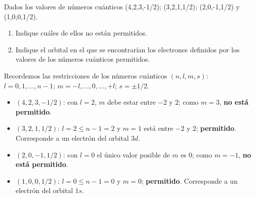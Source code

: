 \begin{exercise}
    Dados los valores de números cuánticos (4,2,3,-1/2); (3,2,1,1/2); (2,0,-1,1/2) y (1,0,0,1/2).
    \begin{enumerate}[label=\letraminuscula]
        \item Indique cuáles de ellos no están permitidos.
        \item Indique el orbital en el que se encontrarían los electrones definidos por los valores de los números cuánticos permitidos.
    \end{enumerate}
    \begin{solu}
        Recordemos las restricciones de los números cuánticos \((n,l,m,s)\): \(l = 0, 1, \ldots, n-1\); \(m = -l, \ldots, 0, \ldots, +l\); \(s = \pm 1/2\).
        \begin{itemize}
            \item \((4,2,3,-1/2)\): con \(l=2\), \(m\) debe estar entre \(-2\) y \(2\); como \(m=3\), \textbf{no está permitido}.
            \item \((3,2,1,1/2)\): \(l=2 \leq n-1=2\) y \(m=1\) está entre \(-2\) y \(2\); \textbf{permitido}. Corresponde a un electrón del orbital \(3d\).
            \item \((2,0,-1,1/2)\): con \(l=0\) el único valor posible de \(m\) es \(0\); como \(m=-1\), \textbf{no está permitido}.
            \item \((1,0,0,1/2)\): \(l=0\leq n-1=0\) y \(m=0\); \textbf{permitido}. Corresponde a un electrón del orbital \(1s\).
        \end{itemize}
    \end{solu}
\end{exercise}

